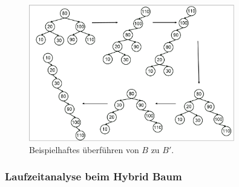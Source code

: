 \documentclass[a4paper,12pt]{article}
\begin{document}
\begin{figure}[h]
	\centering
	\includegraphics[width= 0.8\textwidth]{"Medien/Zipper/hybrid/listeHybrid"}
	\caption{Beispielhaftes überführen von $B$ zu $B'$. }
	\label{fig:listeHybrid}
\end{figure}
\subsubsection{Laufzeitanalyse beim Hybrid Baum}
\end{document}
